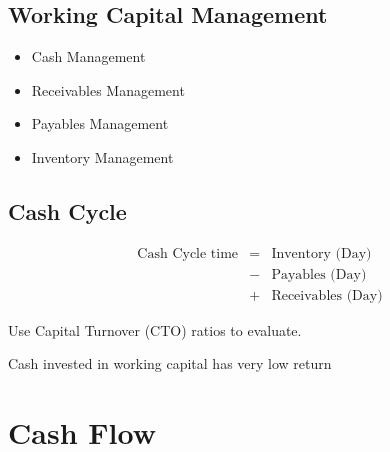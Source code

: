 \documentclass[a4paper] {scrartcl}
\begin{document}
\subsection{Working Capital Management}
\begin{itemize}
	\item Cash Management
	\item Receivables Management
	\item Payables Management
	\item Inventory Management
\end{itemize}

\subsection{Cash Cycle}
\begin{eqnarray*}
	\text{Cash Cycle time} 
	&=&	\text{Inventory (Day)}\\
	&-& \text{Payables (Day)}\\ 
	&+& \text{Receivables (Day)}
\end{eqnarray*}

Use Capital Turnover (CTO) ratios to evaluate.

Cash invested in working capital has very low return

\section{Cash Flow}
\end{document}
